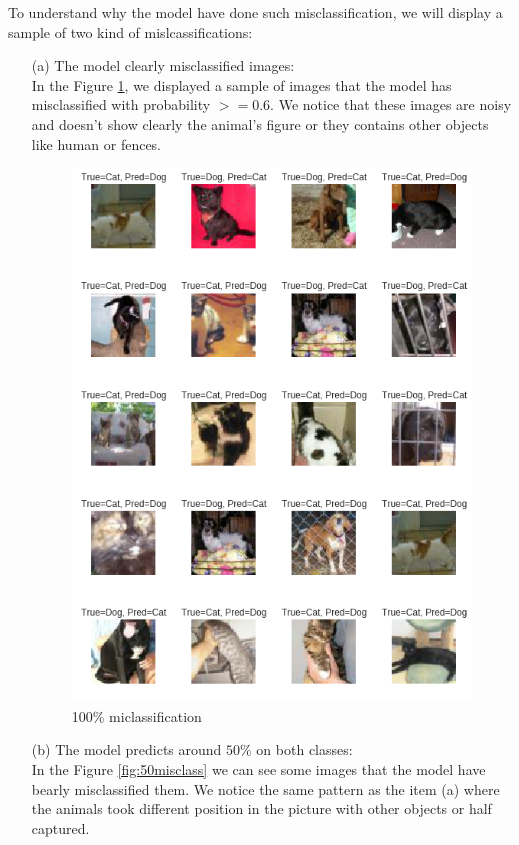 \documentclass[a4paper]{article}
\begin{document}
To understand why the model have done such misclassification, we will display a sample of two kind of mislcassifications:

\begin{itemize}
	\item[(a)] The model clearly misclassified images:\\
	In the Figure \ref{fig:100misclass}, we displayed a sample of images that the model has misclassified with probability $>= 0.6$.
	We notice that these images are noisy and doesn't show clearly the animal's figure or they contains other objects like human or fences.
	
	\begin{figure}[h!]
		\centering
		\includegraphics[scale=.4]{100misclass.png}
		\caption{100\% miclassification}
		\label{fig:100misclass}
	\end{figure}

\item[(b)] The model predicts around $50\%$ on both classes:\\
In the Figure \ref{fig:50misclass} we can see some images that the model have bearly misclassified them. We notice the same pattern as the item (a) where the animals took different position in the picture with other objects or half captured.



\end{itemize}
\end{document}

